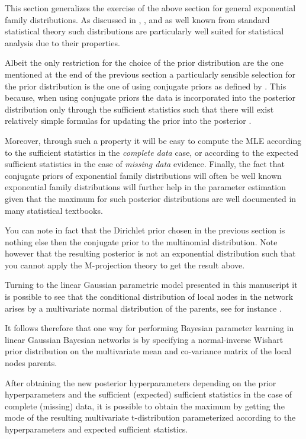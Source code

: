 \documentclass[11pt]{article}
\begin{document}
\begin{article}
This section generalizes the exercise of the above section for
general exponential family distributions. As discussed in
\cite{barndorff1978hyperbolic}, \cite{geiger1998asymptotic},
\cite{lauritzen1996graphical} and as well known from standard
statistical theory such distributions are particularly well suited
for statistical analysis due to their properties. 

Albeit the only restriction for the choice of the prior
distribution are the one mentioned at the end of the previous
section a particularly sensible selection for the prior
distribution is the one of using conjugate priors as defined by
\cite{schlaifer1961applied}. This because, when using conjugate
priors the data is incorporated into the posterior distribution
only through the sufficient statistics such that there will exist
relatively simple formulas for updating the prior into the
posterior \cite{fink1997compendium}.

Moreover, through such a property it will be easy to compute the
MLE according to the sufficient statistics in the \emph{complete data}
case, or according to the expected sufficient statistics in the
case of \emph{missing data} evidence. Finally, the fact that conjugate
priors of exponential family distributions will often be well
known exponential family distributions will further help in the
parameter estimation given that the maximum for such posterior
distributions are well documented in many statistical textbooks.

You can note in fact that the Dirichlet prior chosen in the previous
section is nothing else then the conjugate prior to the
multinomial distribution. Note however that the resulting
posterior is not an exponential distribution such that you cannot
apply the M-projection theory to get the result above.

Turning to the linear Gaussian parametric model presented in this
manuscript it is possible to see that the conditional distribution
of local nodes in the network arises by a multivariate normal
distribution of the parents, see for instance
\cite{koller2009probabilistic}.

It follows therefore that one way for performing Bayesian
parameter learning in linear Gaussian Bayesian networks is by
specifying a normal-inverse Wishart prior distribution on the
multivariate mean and co-variance matrix of the local nodes
parents.

After obtaining the new posterior hyperparameters depending on the
prior hyperparameters and the sufficient (expected) sufficient
statistics in the case of complete (missing) data, it is possible
to obtain the maximum by getting the mode of the resulting
multivariate t-distribution parameterized according to the
hyperparameters and expected sufficient statistics.


\end{article}
\end{document}
